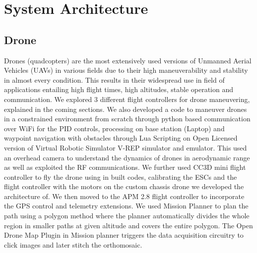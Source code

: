 
\chapter{System Architecture}

\section{Drone}
Drones (quadcopters) are the most extensively used versions of Unmanned Aerial Vehicles (UAVs) in various fields due to their high maneuverability and stability in almost every condition. This results in their widespread use in field of applications entailing high flight times, high altitudes, stable operation and communication. We explored 3 different flight controllers for drone maneuvering, explained in the coming sections. We also developed a code to maneuver drones in a constrained environment from scratch through python based communication over WiFi for the PID controls, processing on base station (Laptop) and waypoint navigation with obstacles through Lua Scripting on Open Licensed version of Virtual Robotic Simulator V-REP simulator and emulator. This used an overhead camera to understand the dynamics of drones in aerodynamic range as well as exploited the RF communications. We further used CC3D mini flight controller to fly the drone using in built codes, calibrating the ESCs and the flight controller with the motors on the custom chassis drone we developed the architecture of. We then moved to the APM 2.8 flight controller to incorporate the GPS control and telemetry extensions. We used Mission Planner to plan the path using a polygon method where the planner automatically divides the whole region in smaller paths at given altitude and covers the entire polygon. The Open Drone Map Plugin in Mission planner triggers the data acquisition circuitry to click images and later stitch the orthomosaic. 

